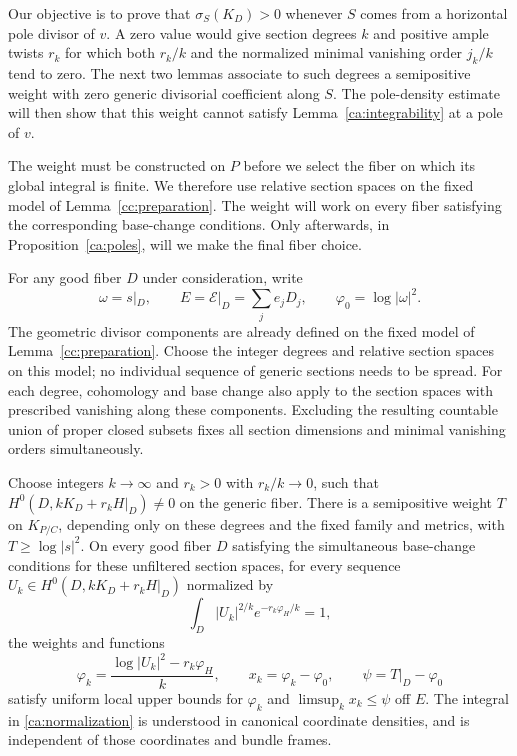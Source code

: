 Our objective is to prove that $\sigma_S(K_D)>0$ whenever
$S$ comes from a horizontal pole divisor of $v$. A zero value
would give section degrees $k$ and positive ample twists $r_k$
for which both $r_k/k$ and the normalized minimal vanishing
order $j_k/k$ tend to zero. The next two lemmas associate to
such degrees a semipositive weight with zero generic divisorial
coefficient along $S$. The pole-density estimate will then show
that this weight cannot satisfy Lemma~\ref{ca:integrability}
at a pole of $v$.

The weight must be constructed on $P$ before we select the fiber
on which its global integral is finite. We therefore use relative
section spaces on the fixed model of Lemma~\ref{cc:preparation}.
The weight will work on every fiber satisfying the corresponding
base-change conditions. Only afterwards, in
Proposition~\ref{ca:poles}, will we make the final fiber choice.

For any good fiber \(D\) under consideration, write
\[
 \omega=s|_D,\qquad E=\mathcal E|_D=\sum_j e_jD_j,
 \qquad \varphi_0=\log|\omega|^2.
\]
The geometric divisor components are already defined on the fixed
model of Lemma~\ref{cc:preparation}.  Choose the integer degrees and
relative section spaces on this model; no individual sequence of
generic sections needs to be spread.  For each degree, cohomology and
base change also apply to the section
spaces with prescribed vanishing along these components.  Excluding
the resulting countable union of proper closed subsets fixes all
section dimensions and minimal vanishing orders simultaneously.

\begin{lemma}\label{ca:bergman}
Choose integers \(k\to\infty\) and \(r_k>0\) with
\(r_k/k\to0\), such that
\(H^0(D,kK_D+r_kH|_D)\ne0\) on the generic fiber.  There is a
semipositive weight \(T\) on \(K_{P/C}\), depending only on these
degrees and the fixed family and metrics, with \(T\geq\log|s|^2\).
On every good fiber \(D\) satisfying the simultaneous base-change
conditions for these unfiltered section spaces, for every sequence
\(U_k\in H^0(D,kK_D+r_kH|_D)\) normalized by
\begin{equation}\label{ca:normalization}
 \int_D |U_k|^{2/k}e^{-r_k\varphi_H/k}=1,
\end{equation}
the weights and functions
\begin{equation}\label{ca:section-weights}
 \varphi_k=\frac{\log|U_k|^2-r_k\varphi_H}{k},
 \qquad x_k=\varphi_k-\varphi_0,
 \qquad \psi=T|_D-\varphi_0
\end{equation}
satisfy uniform local upper bounds for \(\varphi_k\) and
\(\limsup_k x_k\leq\psi\) off \(E\).  The integral in
\eqref{ca:normalization} is understood in canonical coordinate
densities, and is independent of those coordinates and bundle
frames.
\end{lemma}

